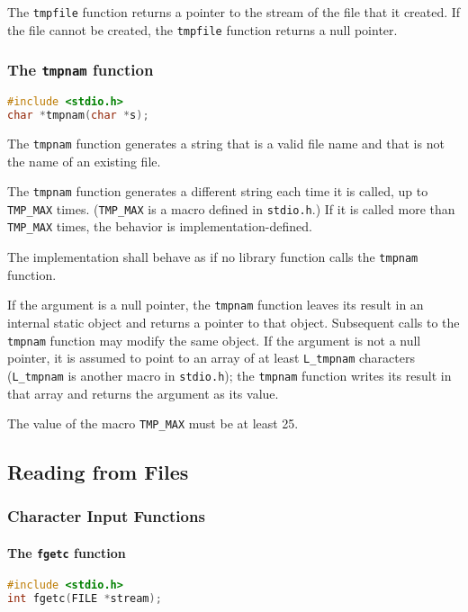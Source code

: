 The \texttt{tmpfile} function returns a pointer to the stream of the file that
it created. If the file cannot be created, the \texttt{tmpfile} function
returns a null pointer.

\subsubsection{The \texttt{tmpnam} function}
\lstset{basicstyle=\scriptsize, numbers=left, captionpos=b, tabsize=4}
\begin{lstlisting}[caption=Section \thesection listing \arabic{filecnt},language={C},
breaklines=true,xleftmargin=15pt,label=lst:section\thesection listing\arabic{filecnt}]
#include <stdio.h>
char *tmpnam(char *s);
\end{lstlisting}

The \texttt{tmpnam} function generates a string that is a valid file name and
that is not the name of an existing file.

The \texttt{tmpnam} function generates a different string each time it is
called, up to \texttt{TMP\_MAX} times. (\texttt{TMP\_MAX} is a macro defined in
\texttt{stdio.h}.) If it is called more than \texttt{TMP\_MAX} times, the
behavior is implementation-defined.

The implementation shall behave as if no library function calls the
\texttt{tmpnam} function.

If the argument is a null pointer, the \texttt{tmpnam} function leaves its
result in an internal static object and returns a pointer to that object.
Subsequent calls to the \texttt{tmpnam} function may modify the same object. If
the argument is not a null pointer, it is assumed to point to an array of at
least \texttt{L\_tmpnam} characters (\texttt{L\_tmpnam} is another macro in
\texttt{stdio.h}); the \texttt{tmpnam} function writes its result in that array
and returns the argument as its value.

The value of the macro \texttt{TMP\_MAX} must be at least 25.

\subsection{Reading from Files}
\subsubsection{Character Input Functions}
\paragraph{The \texttt{fgetc} function}
\lstset{basicstyle=\scriptsize, numbers=left, captionpos=b, tabsize=4}
\begin{lstlisting}[caption=Section \thesection listing \arabic{filecnt},language={C},
breaklines=true,xleftmargin=15pt,label=lst:section\thesection listing\arabic{filecnt}]
#include <stdio.h>
int fgetc(FILE *stream);
\end{lstlisting}

